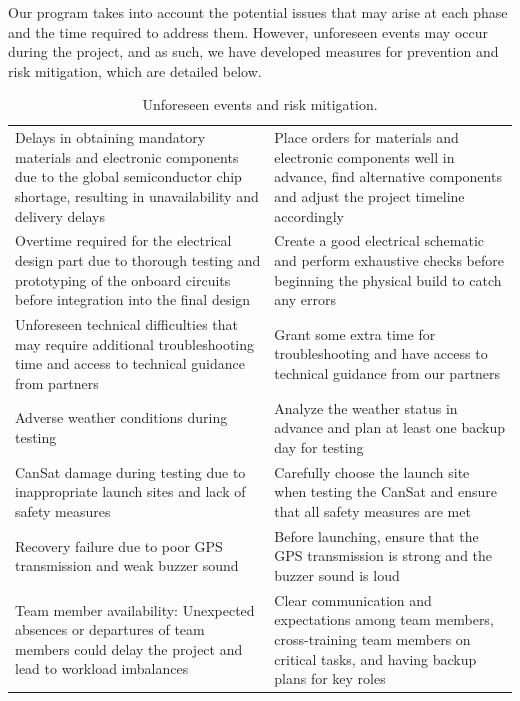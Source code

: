 \documentclass[11pt]{article}
\begin{document}
Our program takes into account the potential issues that may arise at each phase and the time required to address them. However, unforeseen events may occur during the project, and as such, we have developed measures for prevention and risk mitigation, which are detailed below.

\begin{table}[htbp]
\centering
{}
\begin{tabular}{>{\raggedright\arraybackslash}p{8cm}>{\raggedright\arraybackslash}p{7cm}}
\rowcolor{DeepSkyBlue4}
\hline
\multicolumn{1}{c}{\textbf{\color{white!50}{Major risks}}} & \multicolumn{1}{c}{\textbf{\color{white!50}{Mitigation}}} \\
\hline
Delays in obtaining mandatory materials and electronic components due to the global semiconductor chip shortage, resulting in unavailability and delivery delays & Place orders for materials and electronic components well in advance, find alternative components and adjust the project timeline accordingly \\
\rowcolor{LightCyan1!50}Overtime required for the electrical design part due to thorough testing and prototyping of the onboard circuits before integration into the final design & Create a good electrical schematic and perform exhaustive checks before beginning the physical build to catch any errors \\
Unforeseen technical difficulties that may require additional troubleshooting time and access to technical guidance from partners & Grant some extra time for troubleshooting and have access to technical guidance from our partners \\
\rowcolor{LightCyan1!50}Adverse weather conditions during testing & Analyze the weather status in advance and plan at least one backup day for testing \\
CanSat damage during testing due to inappropriate launch sites and lack of safety measures & Carefully choose the launch site when testing the CanSat and ensure that all safety measures are met \\
\rowcolor{LightCyan1!50}Recovery failure due to poor GPS transmission and weak buzzer sound & Before launching, ensure that the GPS transmission is strong and the buzzer sound is loud \\
Team member availability: Unexpected absences or departures of team members could delay the project and lead to workload imbalances & Clear communication and expectations among team members, cross-training team members on critical tasks, and having backup plans for key roles \\
\hline
\end{tabular}
\caption{Unforeseen events and risk mitigation.}
\label{tab:risks}
\end{table}
\end{document}
